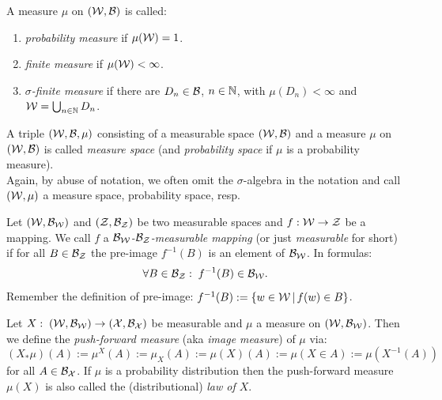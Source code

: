 \begin{Def}
    A measure $\mu$ on $(\mathcal{W},\mathcal{B})$ is called:
    \begin{enumerate}
        \item \emph{probability measure} if $\mu(\mathcal{W})=1$.
        \item \emph{finite measure} if $\mu(\mathcal{W}) < \infty$.
        \item \emph{$\sigma$-finite measure} if there are $D_n \in \mathcal{B}$, $n \in \mathbb{N}$, with $\mu(D_n) < \infty$ and $\mathcal{W} = \bigcup_{n \in \mathbb{N}} D_n$.
    \end{enumerate}
\end{Def}

\begin{Def}
    A triple $(\mathcal{W}, \mathcal{B}, \mu)$ consisting of a measurable space $(\mathcal{W},\mathcal{B})$ and a measure $\mu$ on $(\mathcal{W},\mathcal{B})$ is called \emph{measure space}
    (and \emph{probability space} if $\mu$ is a probability measure).\\
    Again, by abuse of notation, we often omit the $\sigma$-algebra in the notation and call $(\mathcal{W},\mu)$ a measure space, probability space, resp.
\end{Def}

\begin{Def}
    Let $(\mathcal{W},\mathcal{B}_{\mathcal{W}})$ and $(\mathcal{Z},\mathcal{B}_{\mathcal{Z}})$ be two measurable spaces and $f: \mathcal{W} \to \mathcal{Z}$ be a mapping.
    We call $f$ a \emph{$\mathcal{B}_{\mathcal{W}}$-$\mathcal{B}_{\mathcal{Z}}$-measurable mapping} (or just \emph{measurable} for short) if
    for all $B \in \mathcal{B}_{\mathcal{Z}}$ the pre-image $f^{-1}(B)$ is an element of $\mathcal{B}_{\mathcal{W}}$. In formulas:
    \[\forall B \in \mathcal{B}_{\mathcal{Z}}:\; f^{-1}(B) \in \mathcal{B}_{\mathcal{W}}.\]
    Remember the definition of pre-image: $f^{-1}(B) := \{ w\in \mathcal{W}\,|\, f(w) \in B \}$.
\end{Def}



\begin{Def}
    Let  $X:\; (\mathcal{W},\mathcal{B}_{\mathcal{W}}) \to (\mathcal{X},\mathcal{B}_{\mathcal{X}})$ be measurable and $\mu$ a measure on $(\mathcal{W},\mathcal{B}_{\mathcal{W}})$.
    Then we define the \emph{push-forward measure} (aka \emph{image measure}) of $\mu$ via:
    \[ (X_*\mu)(A):= \mu^X(A) := \mu_X(A) := \mu(X)(A):= \mu(X \in A):= \mu(X^{-1}(A))\]
    for all $A \in \mathcal{B}_{\mathcal{X}}$.
    If $\mu$ is a probability distribution then the push-forward measure $\mu(X)$ is also called the (distributional) \emph{law of $X$}.
\end{Def}


